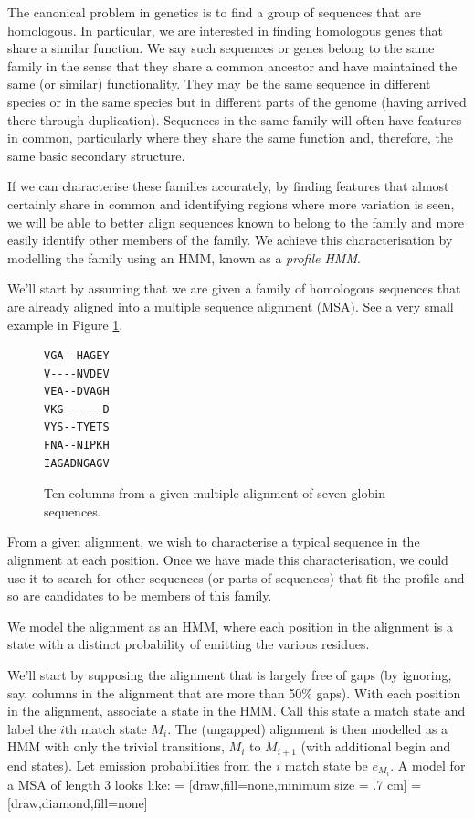 \documentclass[11pt]{article}
\begin{document}
The canonical  problem in genetics is to find a group of sequences that are homologous.  In particular, we are interested in finding homologous genes that share a similar function.  We say such sequences or genes belong to the same family in the sense that they share a common ancestor and have maintained the same (or similar) functionality. They may be the same sequence in different species or in the same species but in different parts of the genome (having arrived there through duplication).     Sequences in the same family will often have features in common, particularly where they share the same function and, therefore, the same basic secondary structure. 

If we can characterise these families accurately, by finding features that almost certainly share in common and identifying regions where more variation is seen,   we will be able to better align sequences known to belong to the family and  more easily identify other members of the family.  We achieve this characterisation by modelling the family using an HMM, known as a {\em profile HMM}.
 

We'll start by assuming that we are given a family of homologous sequences that are already aligned into a multiple sequence alignment (MSA).  See a very small example in Figure \ref{fig:msa}.




\begin{figure}[htb]
\begin{verbatim}
VGA--HAGEY
V----NVDEV
VEA--DVAGH
VKG------D
VYS--TYETS
FNA--NIPKH
IAGADNGAGV
\end{verbatim}
\vspace{-5mm}
\caption{Ten columns from a given multiple alignment of seven globin sequences.}
\label{fig:msa}
\end{figure}
From a given alignment, we wish to characterise a typical sequence in the alignment at each position.    Once we have made this characterisation, we could use it to search for other sequences (or parts of sequences) that fit the profile and so are candidates to be members of this family.

We model the alignment as an HMM, where each position in the alignment is a state with a distinct probability of emitting the various residues.  

We'll start by supposing the alignment that is largely  free of gaps (by ignoring, say, columns in the alignment that are more than 50\% gaps).
With each position in the alignment, associate a state in the HMM.   Call this state a match state and label the $i$th match state  $M_i$. The (ungapped) alignment is then modelled as a HMM with only the trivial transitions, $M_i$ to $M_{i+1}$ (with additional begin and end states).   Let emission probabilities from the $i$ match state be  $e_{M_i}$.  A model for a MSA of length 3 looks like:
 = [draw,fill=none,minimum size = .7 cm]
 = [draw,diamond,fill=none]
\end{document}
